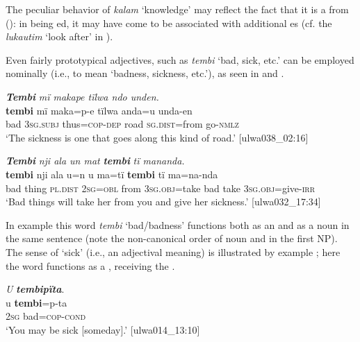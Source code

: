 The peculiar behavior of \textit{kalam} ‘knowledge’ may reflect the fact that it is a  from  (): in being ed, it may have come to be associated with additional es (cf. the   \textit{lukautim} ‘look after’ in ).

  Even fairly prototypical adjectives, such as \textit{tembi} ‘bad, sick, etc.’ can be employed nominally (i.e., to mean ‘badness, sickness, etc.’), as seen in  and .

\ea%
    \label{ex:adj:19}
          \textbf{\textit{Tembi}} \textit{mï makape tïlwa ndo unden.}\\
\gll    \textbf{tembi}  mï      maka=p-e    tïlwa  anda=u    unda-en\\
    bad    3\textsc{sg.subj}  thus=\textsc{cop-dep}  road  \textsc{sg.dist}=from  go-\textsc{nmlz}\\
\glt `The sickness is one that goes along this kind of road.’ [ulwa038\_02:16]
\z

\ea%
    \label{ex:adj:20}
          \textbf{\textit{Tembi}} \textit{nji ala un mat} \textbf{\textit{tembi}} \textit{tï mananda.}\\
\gll    \textbf{tembi}  nji    ala      u=n    u    ma=tï      \textbf{tembi}  tï    ma=na-nda\\
    bad    thing  \textsc{pl.dist}  2\textsc{sg=obl}  from  3\textsc{sg.obj}=take  bad  take  3\textsc{sg.obj}=give-\textsc{irr}\\

\glt `Bad things will take her from you and give her sickness.’ [ulwa032\_17:34]
\z

In example  this word \textit{tembi} ‘bad/badness’ functions both as an  and as a noun in the same sentence (note the non-canonical order of noun and  in the first NP). The sense of ‘sick’ (i.e., an adjectival meaning) is illustrated by example ; here the word functions as a , receiving the .

\ea%
    \label{ex:adj:21}
          \textit{U} \textbf{\textit{tembipïta}}.\\
\gll u    \textbf{tembi}=p{}-ta\\
    2\textsc{sg}  bad=\textsc{cop-cond}\\
\glt `You may be sick [someday].’ [ulwa014\_13:10]
\z



